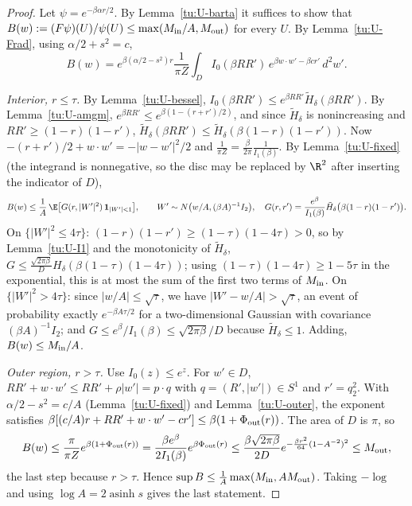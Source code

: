 \begin{proof}
Let $\psi=e^{-\beta\alpha r/2}$. By Lemma~\ref{tu:U-barta} it suffices to show that
$B(w):=(F\psi)(U)/\psi(U)\le\max(M_{\rm in}/A,M_{\rm out})$ for every $U$. By Lemma~\ref{tu:U-Frad}, using
$\alpha/2+s^2=c$,
\[
B(w)=e^{\beta(\alpha/2-s^2)r}\frac{1}{\pi Z}\int_DI_0(\beta RR')\,e^{\beta w\cdot w'-\beta cr'}\,d^2w'.
\]

\emph{Interior, $r\le\tau$.} By Lemma~\ref{tu:U-bessel}, $I_0(\beta RR')\le e^{\beta RR'}\tilde H_\delta(\beta RR')$. By
Lemma~\ref{tu:U-amgm}, $e^{\beta RR'}\le e^{\beta(1-(r+r')/2)}$, and since $\tilde H_\delta$ is nonincreasing and
$RR'\ge(1-r)(1-r')$, $\tilde H_\delta(\beta RR')\le\tilde H_\delta(\beta(1-r)(1-r'))$. Now
$-(r+r')/2+w\cdot w'=-|w-w'|^2/2$ and $\frac1{\pi Z}=\frac{\beta}{2\pi}\frac1{I_1(\beta)}$. By Lemma~\ref{tu:U-fixed}
(the integrand is nonnegative, so the disc may be replaced by $\R^2$ after inserting the indicator of $D$),
\[
B(w)\le\frac1A\,\E\bigl[G(r,|W'|^2)\,\mathbf 1_{|W'|<1}\bigr],\qquad W'\sim N\bigl(w/A,(\beta A)^{-1}I_2\bigr),\quad
G(r,r')=\frac{e^\beta}{I_1(\beta)}\tilde H_\delta\bigl(\beta(1-r)(1-r')\bigr).
\]
On $\{|W'|^2\le4\tau\}$: $(1-r)(1-r')\ge(1-\tau)(1-4\tau)>0$, so by Lemma~\ref{tu:U-I1} and the monotonicity of
$\tilde H_\delta$, $G\le\frac{\sqrt{2\pi\beta}}DH_\delta(\beta(1-\tau)(1-4\tau))$; using $(1-\tau)(1-4\tau)\ge1-5\tau$ in the
exponential, this is at most the sum of the first two terms of $M_{\rm in}$. On $\{|W'|^2>4\tau\}$: since
$|w/A|\le\sqrt\tau$, we have $|W'-w/A|>\sqrt\tau$, an event of probability exactly $e^{-\beta A\tau/2}$ for a
two-dimensional Gaussian with covariance $(\beta A)^{-1}I_2$; and $G\le e^\beta/I_1(\beta)\le\sqrt{2\pi\beta}/D$ because
$\tilde H_\delta\le1$. Adding, $B(w)\le M_{\rm in}/A$.

\emph{Outer region, $r>\tau$.} Use $I_0(z)\le e^z$. For $w'\in D$, $RR'+w\cdot w'\le RR'+\rho|w'|=p\cdot q$ with
$q=(R',|w'|)\in S^1$ and $r'=q_2^2$. With $\alpha/2-s^2=c/A$ (Lemma~\ref{tu:U-fixed}) and Lemma~\ref{tu:U-outer},
the exponent satisfies $\beta[(c/A)r+RR'+w\cdot w'-cr']\le\beta(1+\Phi_{\rm out}(r))$. The area of $D$ is $\pi$, so
\[
B(w)\le\frac{\pi}{\pi Z}e^{\beta(1+\Phi_{\rm out}(r))}=\frac{\beta e^\beta}{2I_1(\beta)}e^{\beta\Phi_{\rm out}(r)}
\le\frac{\beta\sqrt{2\pi\beta}}{2D}e^{-\frac{\beta r^2}{64}(1-A^{-2})^2}\le M_{\rm out},
\]
the last step because $r>\tau$. Hence $\sup B\le\frac1A\max(M_{\rm in},AM_{\rm out})$. Taking $-\log$ and using
$\log A=2\operatorname{asinh}s$ gives the last statement.
\end{proof}

